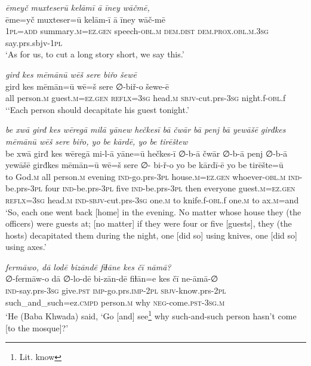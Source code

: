 \ea \label{BP.63}
\textit{ēmeyč muxteserū kelāmī ā īney wāčmē,} \\ 
\gll ēme=yč muxteser=ū kelām-ī ā īney wāč-mē \\ 
 \textsc{1pl}\textsc{=add} summary\textsc{.m}\textsc{=ez.gen} speech\textsc{-obl}\textsc{.m} \textsc{dem.dist} \textsc{dem.prox}\textsc{.obl}\textsc{.m}\textsc{.3sg} say.prs.sbjv\textsc{-\textsc{1pl}} \\ 
\glt `As for us, to cut a long story short, we say this.'
\z 
 
\ea \label{BP.67}
\textit{gird kes mēmānū wēš sere biřo šewē} \\ 
\gll gird kes mēmān=ū wē=š sere ∅-biř-o šewe-ē \\ 
 all person\textsc{.m} guest\textsc{.m}\textsc{=ez.gen} \textsc{reflx}\textsc{=3sg} head\textsc{.m} \textsc{sbjv-}cut.prs\textsc{-3sg} night.f\textsc{-obl}.f \\ 
\glt `‘Each person should decapitate his guest tonight.'
\z 
 
\ea \label{BP.70}
\textit{be xwā girđ kes wēregā milā yānew hečkesī bā čwār bā penj bā yewāšē girđkes mēmānū wēš sere biřo, yo be kārdē, yo be tirēštew} \\ 
\gll be xwā girđ kes wēregā mi-l-ā yāne=ū hečkes-ī ∅-b-ā čwār ∅-b-ā penj ∅-b-ā yewāšē girđkes mēmān=ū wē=š sere ∅- bi-ř-o yo be kārdī-ē yo be tirēšte=ū \\ 
 to God\textsc{.m} all person\textsc{.m} evening \textsc{ind-}go.prs\textsc{-3pl} house\textsc{.m}\textsc{=ez.gen} whoever\textsc{-obl}\textsc{.m} \textsc{ind-}be.prs\textsc{-3pl} four \textsc{ind-}be.prs\textsc{-3pl} five \textsc{ind-}be.prs\textsc{-3pl} then everyone guest\textsc{.m}\textsc{=ez.gen} \textsc{reflx}\textsc{=3sg} head\textsc{.m} \textsc{ind-}\textsc{sbjv-}cut.prs\textsc{-3sg} one\textsc{.m} to knife.f\textsc{-obl}.f one\textsc{.m} to ax\textsc{.m}=and \\ 
\glt `So, each one went back [home] in the evening. No matter whose house they (the officers) were guests at; [no matter] if they were four or five [guests],  they  (the hosts) decapitated them during the night, one [did so] using knives, one [did so] using axes.'
\z 
 
\ea \label{BP.77}
\textit{fermāwo, dā lodē bizāndē fiɫāne kes čī nāmā?} \\ 
\gll ∅-fermāw-o dā ∅-lo-dē bi-zān-dē fiɫān=e kes čī ne-āmā-∅ \\ 
 \textsc{ind-}say.prs\textsc{-3sg} give\textsc{.pst} \textsc{imp-}go.prs.\textsc{imp-}\textsc{2pl} \textsc{sbjv-}know.prs-\textsc{2pl} such\_and\_such=ez\textsc{.cmpd} person\textsc{.m} why \textsc{neg-}come\textsc{.pst}\textsc{-3sg}\textsc{.m} \\ 
\glt `He (Baba Khwada) said, ‘Go [and] see\footnote{Lit. know} why such-and-such person hasn’t come [to the mosque]?'
\z 
 
